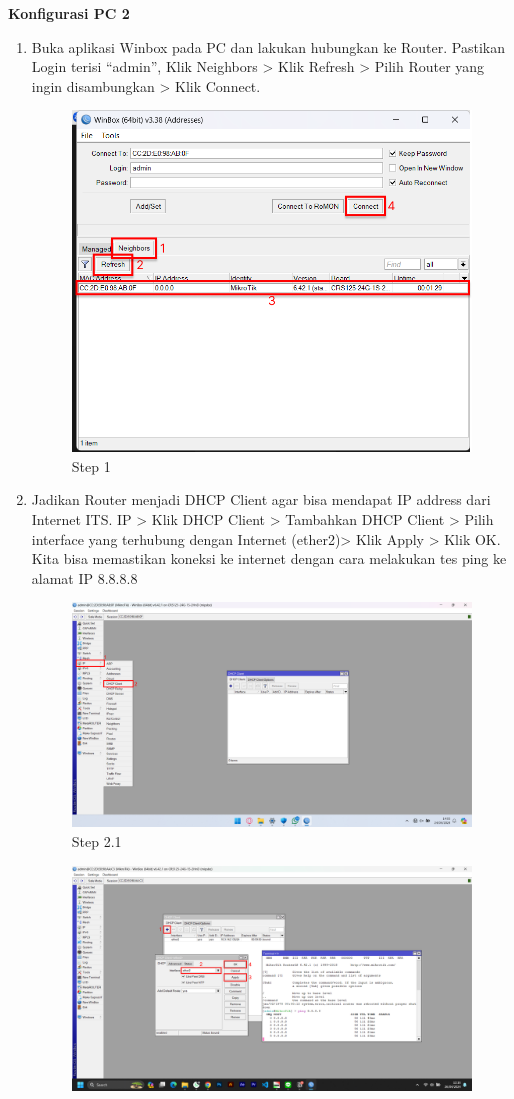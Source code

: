 \begin{center}
    \textbf{Konfigurasi PC 2}
    \begin{enumerate}
        \item Buka aplikasi Winbox pada PC dan lakukan hubungkan ke Router. Pastikan Login terisi “admin”, Klik Neighbors > Klik Refresh > Pilih Router yang ingin disambungkan > Klik Connect.
        \begin{figure}[H]
			\centering
			\includegraphics[width=0.5\linewidth]{P4/img/pc2/Step 1.png}
			\caption{Step 1}
			\label{fig:Step 1(PC 2)}
		\end{figure}
        \item Jadikan Router menjadi DHCP Client agar bisa mendapat IP address dari Internet ITS. IP > Klik DHCP Client > Tambahkan DHCP Client > Pilih interface yang terhubung dengan Internet (ether2)> Klik Apply > Klik OK. Kita bisa memastikan koneksi ke internet dengan cara melakukan tes ping ke alamat IP 8.8.8.8
        \begin{figure}[H]
			\centering
			\includegraphics[width=0.5\linewidth]{P4/img/pc2/Step 2.1.png}
			\caption{Step 2.1}
			\label{fig:Step 2.1(PC 2)}
        \end{figure}
        \begin{figure}[H]
			\centering
			\includegraphics[width=0.8\linewidth]{P4/img/pc2/Step 2.2.png}

\end{figure}
\end{enumerate}
\end{center}
